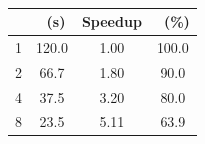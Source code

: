\begin{table}[htbp]
  \centering
  \small
  \renewcommand{\arraystretch}{1.25}
  \setlength{\tabcolsep}{12pt}
  \begin{tabular}{r S[table-format=3.1] S[table-format=1.2] S[table-format=3.1]}
    \toprule
    {\textbf{}} &
    {\textbf{\ (\unit{\second})}} &
    {\textbf{Speedup}} &
    {\textbf{\ (\unit{\percent})}} \\
     & 120.0 & 1.00 & 100.0 \\
    2 & 66.7  & 1.80 & 90.0  \\
    4 & 37.5  & 3.20 & 80.0  \\
    8 & 23.5  & 5.11 & 63.9  \\
    \bottomrule
  \end{tabular}
  \caption{}
  \label{tab:example-results}
\end{table}

